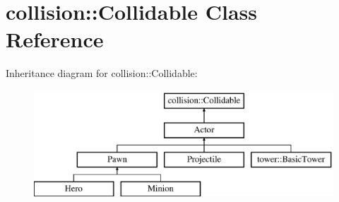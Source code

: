 \hypertarget{classcollision_1_1_collidable}{}\section{collision\+:\+:Collidable Class Reference}
\label{classcollision_1_1_collidable}
Inheritance diagram for collision\+:\+:Collidable\+:\begin{figure}[H]
\begin{center}
\leavevmode
\includegraphics[height=4.000000cm]{classcollision_1_1_collidable}
\end{center}
\end{figure}

